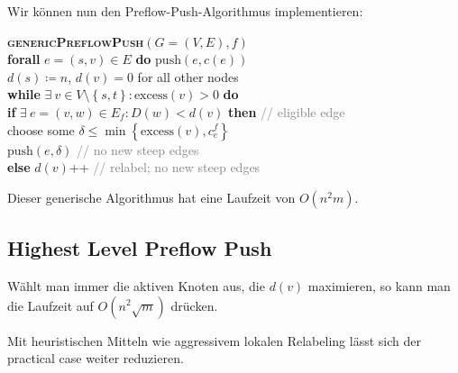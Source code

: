 Wir können nun den Preflow-Push-Algorithmus implementieren:

\begin{pseudocode}
  \textbf{\textsc{genericPreflowPush}}\( (G = (V, E), f) \) \\
  \phantom{\enskip} \textbf{forall} \( e = (s,v) \in E \) \textbf{do} \( \text{push}(e, c(e)) \) \\
  \phantom{\enskip} \( d(s) \coloneqq n \), \( d(v) = 0 \) for all other nodes \\
  \phantom{\enskip} \textbf{while} \( \exists \ v \in V \setminus \left \{ s, t \right \} : \text{excess}(v) > 0 \) \textbf{do} \\
  \phantom{\enskip} \phantom{\enskip} \textbf{if} \( \exists \ e = (v,w) \in E_f : D(w) < d(v) \) \textbf{then} \enskip \textcolor{gray}{// eligible edge} \\
  \phantom{\enskip} \phantom{\enskip} \phantom{\enskip} choose some \( \delta \leq \min \left \{ \text{excess}(v), c_e^f \right \} \) \\
  \phantom{\enskip} \phantom{\enskip} \phantom{\enskip} \( \text{push}(e,\delta) \) \enskip \textcolor{gray}{// no new steep edges} \\
  \phantom{\enskip} \phantom{\enskip} \textbf{else} \( d(v) \)++ \enskip \textcolor{gray}{// relabel; no new steep edges}
  \phantom{\enskip}
\end{pseudocode}

Dieser generische Algorithmus hat eine Laufzeit von \( O(n^2m) \). 

\subsection{Highest Level Preflow Push}

Wählt man immer die aktiven Knoten aus, die \( d(v) \) maximieren, so kann man die Laufzeit auf \( O(n^2\sqrt{m}) \) drücken.

Mit heuristischen Mitteln wie aggressivem lokalen Relabeling lässt sich der practical case weiter reduzieren.